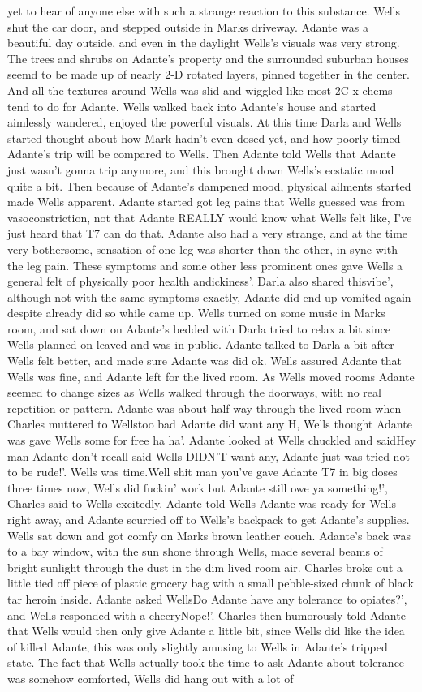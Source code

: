 \documentclass[12pt]{book}
\begin{document}
yet to hear of anyone else with such a strange reaction to this substance. Wells shut the car door, and stepped outside in Marks driveway. Adante was a beautiful day outside, and even in the daylight Wells's visuals was very strong. The trees and shrubs on Adante's property and the surrounded suburban houses seemd to be made up of nearly 2-D rotated layers, pinned together in the center. And all the textures around Wells was slid and wiggled like most 2C-x chems tend to do for Adante. Wells walked back into Adante's house and started aimlessly wandered, enjoyed the powerful visuals. At this time Darla and Wells started thought about how Mark hadn't even dosed yet, and how poorly timed Adante's trip will be compared to Wells. Then Adante told Wells that Adante just wasn't gonna trip anymore, and this brought down Wells's ecstatic mood quite a bit. Then because of Adante's dampened mood, physical ailments started made Wells apparent. Adante started got leg pains that Wells guessed was from vasoconstriction, not that Adante REALLY would know what Wells felt like, I've just heard that T7 can do that. Adante also had a very strange, and at the time very bothersome, sensation of one leg was shorter than the other, in sync with the leg pain. These symptoms and some other less prominent ones gave Wells a general felt of physically poor health andickiness'. Darla also shared thisvibe', although not with the same symptoms exactly, Adante did end up vomited again despite already did so while came up. Wells turned on some music in Marks room, and sat down on Adante's bedded with Darla tried to relax a bit since Wells planned on leaved and was in public. Adante talked to Darla a bit after Wells felt better, and made sure Adante was did ok. Wells assured Adante that Wells was fine, and Adante left for the lived room. As Wells moved rooms Adante seemed to change sizes as Wells walked through the doorways, with no real repetition or pattern. Adante was about half way through the lived room when Charles muttered to Wellstoo bad Adante did want any H, Wells thought Adante was gave Wells some for free ha ha'. Adante looked at Wells chuckled and saidHey man Adante don't recall said Wells DIDN'T want any, Adante just was tried not to be rude!'. Wells was time.Well shit man you've gave Adante T7 in big doses three times now, Wells did fuckin' work but Adante still owe ya something!', Charles said to Wells excitedly. Adante told Wells Adante was ready for Wells right away, and Adante scurried off to Wells's backpack to get Adante's supplies. Wells sat down and got comfy on Marks brown leather couch. Adante's back was to a bay window, with the sun shone through Wells, made several beams of bright sunlight through the dust in the dim lived room air. Charles broke out a little tied off piece of plastic grocery bag with a small pebble-sized chunk of black tar heroin inside. Adante asked WellsDo Adante have any tolerance to opiates?', and Wells responded with a cheeryNope!'. Charles then humorously told Adante that Wells would then only give Adante a little bit, since Wells did like the idea of killed Adante, this was only slightly amusing to Wells in Adante's tripped state. The fact that Wells actually took the time to ask Adante about tolerance was somehow comforted, Wells did hang out with a lot of 
\end{document}
